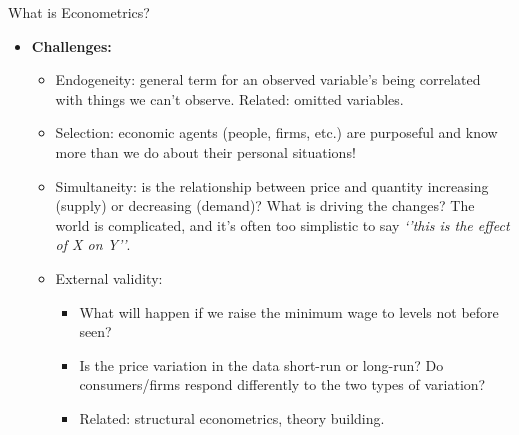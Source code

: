\begin{frame}{What is Econometrics?}
\begin{itemize}	

	\item{\bf Challenges:}
		\begin{itemize}
				\item Endogeneity: general term for an observed variable's being correlated with things we can't observe.
				Related: omitted variables. 
				\medskip
				\item Selection: economic agents (people, firms, etc.) are purposeful and know more than we do about their personal situations!
				\medskip
				\item Simultaneity: is the relationship between price and quantity increasing (supply) or decreasing (demand)? 
				 What is driving the changes? 
				The world is complicated, and it's often too simplistic to say \emph{`'this is the effect of X on Y''}. 
				
			\medskip
			\item External validity:
			\begin{itemize}
				\item What will happen if we raise the minimum wage to levels not before seen? 
				\item Is the price variation in the data short-run or long-run? Do consumers/firms respond differently to 
				the two types of variation?
				\item Related: structural econometrics, theory building. 
			\end{itemize}
		\end{itemize}	
\end{itemize}
\end{frame}






